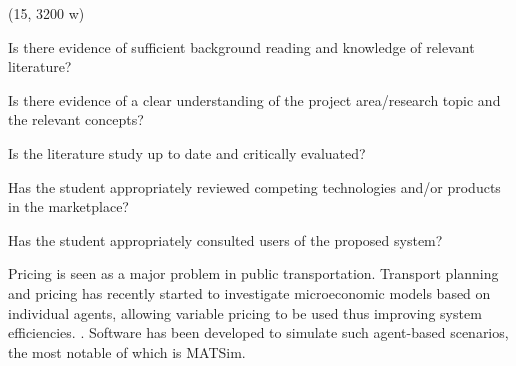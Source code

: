 (15, 3200 w)

Is there evidence of sufficient background reading and knowledge of relevant
literature?

Is there evidence of a clear understanding of the project area/research topic
and the relevant concepts?

Is the literature study up to date and critically evaluated?

Has the student appropriately reviewed competing technologies and/or products
in the marketplace?

Has the student appropriately consulted users of the proposed system?


Pricing is seen as a major problem in public transportation. Transport planning
and pricing has recently started to investigate microeconomic models based on
individual agents, allowing variable pricing to be used thus improving system
efficiencies. \parencite{Emele2013pricing+rural, Kaddoura2013social+cost,
Neumann2011berlin}. Software has been developed to simulate such agent-based
scenarios, the most notable of which is MATSim.
